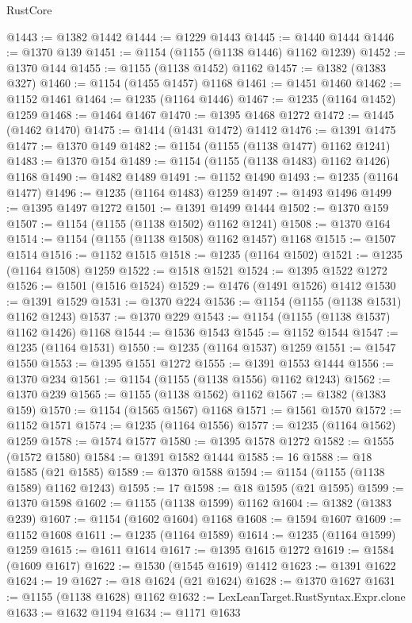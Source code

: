 \begin{lexlean}{RustCore}
\begin{coremodule}
@1443 := @1382 @1442
@1444 := @1229 @1443
@1445 := @1440 @1444
@1446 := @1370 @139
@1451 := @1154 (@1155 (@1138 @1446) @1162 @1239)
@1452 := @1370 @144
@1455 := @1155 (@1138 @1452) @1162
@1457 := @1382 (@1383 @327)
@1460 := @1154 (@1455 @1457) @1168
@1461 := @1451 @1460
@1462 := @1152 @1461
@1464 := @1235 (@1164 @1446)
@1467 := @1235 (@1164 @1452) @1259
@1468 := @1464 @1467
@1470 := @1395 @1468 @1272
@1472 := @1445 (@1462 @1470)
@1475 := @1414 (@1431 @1472) @1412
@1476 := @1391 @1475
@1477 := @1370 @149
@1482 := @1154 (@1155 (@1138 @1477) @1162 @1241)
@1483 := @1370 @154
@1489 := @1154 (@1155 (@1138 @1483) @1162 @1426) @1168
@1490 := @1482 @1489
@1491 := @1152 @1490
@1493 := @1235 (@1164 @1477)
@1496 := @1235 (@1164 @1483) @1259
@1497 := @1493 @1496
@1499 := @1395 @1497 @1272
@1501 := @1391 @1499 @1444
@1502 := @1370 @159
@1507 := @1154 (@1155 (@1138 @1502) @1162 @1241)
@1508 := @1370 @164
@1514 := @1154 (@1155 (@1138 @1508) @1162 @1457) @1168
@1515 := @1507 @1514
@1516 := @1152 @1515
@1518 := @1235 (@1164 @1502)
@1521 := @1235 (@1164 @1508) @1259
@1522 := @1518 @1521
@1524 := @1395 @1522 @1272
@1526 := @1501 (@1516 @1524)
@1529 := @1476 (@1491 @1526) @1412
@1530 := @1391 @1529
@1531 := @1370 @224
@1536 := @1154 (@1155 (@1138 @1531) @1162 @1243)
@1537 := @1370 @229
@1543 := @1154 (@1155 (@1138 @1537) @1162 @1426) @1168
@1544 := @1536 @1543
@1545 := @1152 @1544
@1547 := @1235 (@1164 @1531)
@1550 := @1235 (@1164 @1537) @1259
@1551 := @1547 @1550
@1553 := @1395 @1551 @1272
@1555 := @1391 @1553 @1444
@1556 := @1370 @234
@1561 := @1154 (@1155 (@1138 @1556) @1162 @1243)
@1562 := @1370 @239
@1565 := @1155 (@1138 @1562) @1162
@1567 := @1382 (@1383 @159)
@1570 := @1154 (@1565 @1567) @1168
@1571 := @1561 @1570
@1572 := @1152 @1571
@1574 := @1235 (@1164 @1556)
@1577 := @1235 (@1164 @1562) @1259
@1578 := @1574 @1577
@1580 := @1395 @1578 @1272
@1582 := @1555 (@1572 @1580)
@1584 := @1391 @1582 @1444
@1585 := 16
@1588 := @18 @1585 (@21 @1585)
@1589 := @1370 @1588
@1594 := @1154 (@1155 (@1138 @1589) @1162 @1243)
@1595 := 17
@1598 := @18 @1595 (@21 @1595)
@1599 := @1370 @1598
@1602 := @1155 (@1138 @1599) @1162
@1604 := @1382 (@1383 @239)
@1607 := @1154 (@1602 @1604) @1168
@1608 := @1594 @1607
@1609 := @1152 @1608
@1611 := @1235 (@1164 @1589)
@1614 := @1235 (@1164 @1599) @1259
@1615 := @1611 @1614
@1617 := @1395 @1615 @1272
@1619 := @1584 (@1609 @1617)
@1622 := @1530 (@1545 @1619) @1412
@1623 := @1391 @1622
@1624 := 19
@1627 := @18 @1624 (@21 @1624)
@1628 := @1370 @1627
@1631 := @1155 (@1138 @1628) @1162
@1632 := LexLeanTarget.RustSyntax.Expr.clone
@1633 := @1632 @1194
@1634 := @1171 @1633

\end{coremodule}
\end{lexlean}
